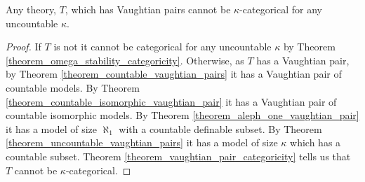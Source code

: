 \begin{theorem}\label{theorem_vaughtian_pairs_categoricity}
Any theory, \(T\), which has Vaughtian pairs cannot be \(\kappa\)-categorical for any uncountable \(\kappa\).
\end{theorem}

\begin{proof}
If \(T\) is not \omst it cannot be categorical for any uncountable \(\kappa\) by Theorem \ref{theorem_omega_stability_categoricity}.
Otherwise, as \(T\) has a Vaughtian pair, by Theorem \ref{theorem_countable_vaughtian_pairs} it has a Vaughtian pair of countable models. 
By Theorem \ref{theorem_countable_isomorphic_vaughtian_pair} it has a Vaughtian pair of countable isomorphic models.
By Theorem \ref{theorem_aleph_one_vaughtian_pair} it has a model of size \(\aleph_1\) with a countable definable subset. 
By Theorem \ref{theorem_uncountable_vaughtian_pairs} it has a model of size \(\kappa\) which has a countable subset.  
Theorem \ref{theorem_vaughtian_pair_categoricity} tells us that \(T\) cannot be \(\kappa\)-categorical. 
\end{proof}
